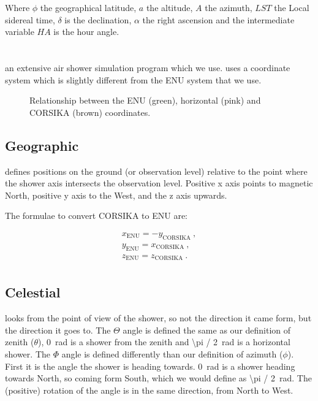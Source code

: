 Where $\phi$ the geographical latitude, $a$ the altitude, $A$ the
azimuth, $\mathit{LST}$ the Local sidereal time, $\delta$ is the
declination, $\alpha$ the right ascension and the intermediate variable
$\mathit{HA}$ is the hour angle.


\section{\corsika}

\corsika an extensive air shower simulation program which we use.
\corsika uses a coordinate system which is slightly different from the
ENU system that we use\cite{corsika}.

\begin{figure}
    \centering
    
    \caption{Relationship between the ENU (green), horizontal (pink)
             and CORSIKA (brown) coordinates.}
    \label{fig:enu_corsika}
\end{figure}


\subsection{Geographic}

\corsika defines positions on the ground (or observation level) relative
to the point where the shower axis intersects the observation level.
Positive x axis points to magnetic North, positive y axis to the West,
and the z axis upwards.

The formulae to convert CORSIKA to ENU are:

\begin{equation}
    \begin{array}{l}
        x_{\mathrm{ENU}} = -y_{\mathrm{CORSIKA}} \ , \\
        y_{\mathrm{ENU}} = x_{\mathrm{CORSIKA}} \ , \\
        z_{\mathrm{ENU}} = z_{\mathrm{CORSIKA}} \ . \\
    \end{array}
\end{equation}


\subsection{Celestial}

\corsika looks from the point of view of the shower, so not the
direction it came form, but the direction it goes to. The $\Theta$ angle
is defined the same as our definition of zenith ($\theta$),
\SI{0}{\radian} is a shower from the zenith and \SI{\pi / 2}{\radian} is
a horizontal shower. The $\Phi$ angle is defined differently than our
definition of azimuth ($\phi$). First it is the angle the shower is heading
towards. \SI{0}{\radian} is a shower heading towards North, so coming
form South, which we would define as \SI{\pi / 2}{\radian}. The
(positive) rotation of the angle is in the same direction, from North to
West.

